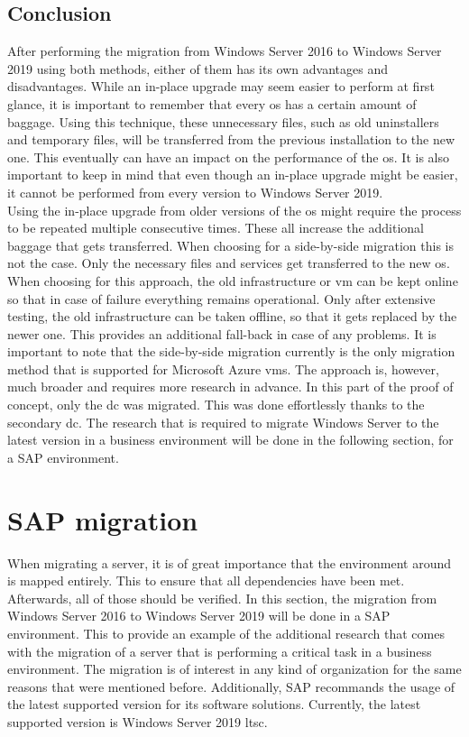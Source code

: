 \subsection{Conclusion}
After performing the migration from Windows Server 2016 to Windows Server 2019 using both methods, either of them has its own advantages and disadvantages. 
While an in-place upgrade may seem easier to perform at first glance, it is important to remember that every \acrshort{os} has a certain amount of baggage.
Using this technique, these unnecessary files, such as old uninstallers and temporary files, will be transferred from the previous installation to the new one. 
This eventually can have an impact on the performance of the \acrshort{os}. 
It is also important to keep in mind that even though an in-place upgrade might be easier, it cannot be performed from every version to Windows Server 2019.
\\
Using the in-place upgrade from older versions of the \acrshort{os} might require the process to be repeated multiple consecutive times. 
These all increase the additional baggage that gets transferred. 
When choosing for a side-by-side migration this is not the case. 
Only the necessary files and services get transferred to the new \acrshort{os}. 
When choosing for this approach, the old infrastructure or \acrshort{vm} can be kept online so that in case of failure everything remains operational. 
Only after extensive testing, the old infrastructure can be taken offline, so that it gets replaced by the newer one. 
This provides an additional fall-back in case of any problems. 
It is important to note that the side-by-side migration currently is the only migration method that is supported for Microsoft Azure \acrshort{vm}s. 
The approach is, however, much broader and requires more research in advance. 
In this part of the proof of concept, only the \acrshort{dc} was migrated. 
This was done effortlessly thanks to the secondary \acrshort{dc}. 
The research that is required to migrate Windows Server to the latest version in a business environment will be done in the following section, for a SAP environment. 
\clearpage

\section{SAP migration}
\label{sec:SAP}
When migrating a server, it is of great importance that the environment around is mapped entirely. 
This to ensure that all dependencies have been met. 
Afterwards, all of those should be verified. 
In this section, the migration from Windows Server 2016 to Windows Server 2019 will be done in a SAP environment. 
This to provide an example of the additional research that comes with the migration of a server that is performing a critical task in a business environment. 
The migration is of interest in any kind of organization for the same reasons that were mentioned before. 
Additionally, SAP recommands the usage of the latest supported version for its software solutions. 
Currently, the latest supported version is Windows Server 2019 \acrshort{ltsc}.

